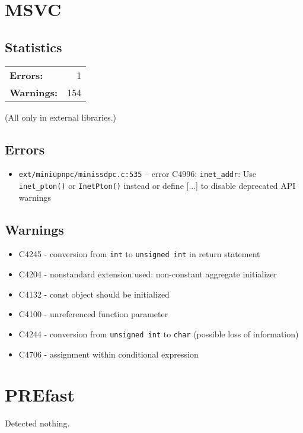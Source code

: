 \documentclass[10pt,a4paper]{article}
\begin{document}
\section*{MSVC}
\subsection*{Statistics}
\begin{tabular}{lr}
\textbf{Errors:} & 1 \\
\textbf{Warnings:} & 154
\end{tabular}

(All only in external libraries.)

\subsection*{Errors}
\begin{itemize}
\item \verb|ext/miniupnpc/minissdpc.c:535| -- error C4996: \verb|inet_addr|: Use \verb|inet_pton()| or \verb|InetPton()| instead or define [...] to disable deprecated API warnings
\end{itemize}

\subsection*{Warnings}
\begin{itemize}
\item C4245 - conversion from \verb|int| to \verb|unsigned int| in return statement
\item C4204 - nonstandard extension used: non-constant aggregate initializer
\item C4132 - const object should be initialized
\item C4100 - unreferenced function parameter
\item C4244 - conversion from \verb|unsigned int| to \verb|char| (possible loss of information)
\item C4706 - assignment within conditional expression
\end{itemize}

\section*{PREfast}
Detected nothing.
\end{document}

